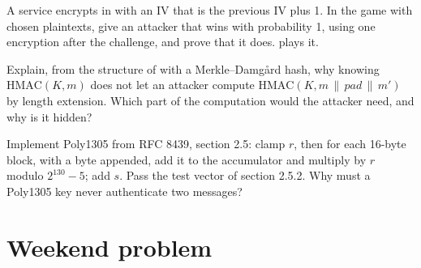 \begin{exercise}[$\star\star\star$]\label{exo:b3:symmetric-cryptography:10}
A service encrypts in  with an IV that is the previous IV plus 1. In the  game with chosen plaintexts, give an attacker that wins with probability 1, using one encryption after the challenge, and prove that it does.  plays it.
\end{exercise}

\begin{exercise}[$\star\star\star$]\label{exo:b3:symmetric-cryptography:11}
Explain, from the structure of  with a Merkle--Damgård hash, why knowing $\mathrm{HMAC}(K, m)$ does not let an attacker compute $\mathrm{HMAC}(K, m \,\|\, \mathit{pad} \,\|\, m')$ by length extension. Which part of the computation would the attacker need, and why is it hidden?
\end{exercise}

\begin{exercise}[$\star\star\star$]\label{exo:b3:symmetric-cryptography:12}
Implement Poly1305 from RFC 8439, section 2.5: clamp $r$, then for each 16-byte block, with a byte  appended, add it to the accumulator and multiply by $r$ modulo $2^{130} - 5$; add $s$. Pass the test vector of section 2.5.2. Why must a Poly1305 key never authenticate two messages?
\end{exercise}

\section{Weekend problem}\label{sec:b3:symmetric-cryptography:problem}

